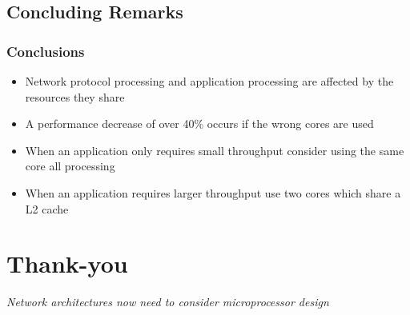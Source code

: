 \documentclass{beamer}
\begin{document}
\subsection[Discussions]{Concluding Remarks}
\begin{frame}
	\frametitle{Conclusions}
	\begin{itemize}
		\item Network protocol processing and application processing are affected by the resources they share
		\item A performance decrease of over 40\% occurs if the wrong cores are used
		\item When an application only requires small throughput consider using the same core all processing
		\item When an application requires larger throughput use two cores which share a L2 cache
	\end{itemize}
\end{frame}


\section[Thank You + Questions?]{Thank-you}
\begin{frame}
  \begin{center}
    \alert{\textit{Network architectures now need to consider microprocessor design}}
	 \titlepage
 \end{center}
\end{frame}
\end{document}
